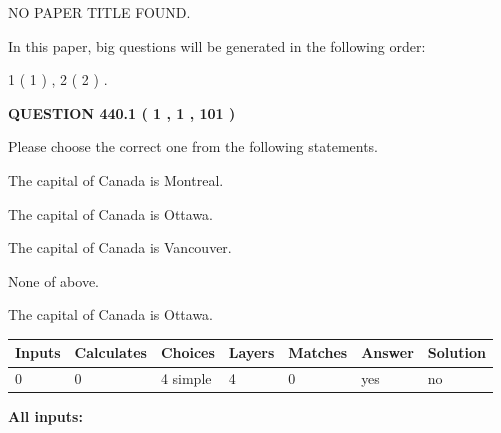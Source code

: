 \documentclass[12pt]{article}
\begin{document}
   
   
   
 NO PAPER TITLE FOUND.
   
   
   
\vspace{0.2in}
   
In this paper, big questions will be generated in the following order: 
   
   
   1 ( 1 )
 ,
   2 ( 2 )
 .
  
\vspace{0.2in}
  
{\textbf{\Large{QUESTION
440.1 
 ( 1 , 1 , 101 )
}}}
  
  
Please choose the correct one from the following statements.
 
 
The capital of Canada is Montreal.
 
 
The capital of Canada is Ottawa.
 
 
The capital of Canada is Vancouver.
 
 
 None of above.
 
 
\noindent{}
 
 
The capital of Canada is Ottawa.
 
 
\noindent{}
 
 
   
   
   
   
\noindent\begin{tabular}{|l|l|l|l|l|l|l|}
 \hline
Inputs & Calculates & Choices & Layers & Matches & Answer & Solution \\ \hline
 0  & 
 0  & 
 4
  simple  
  & 
 4  & 
 0  & 
  yes & 
  no 
  \\ \hline
 \end{tabular}
   
   
   
   
\noindent{}
   
   
   
   
\noindent\vspace{0.1in}\hspace{-0.08in} {\textbf{\Large{All inputs: }}}
   
   
  
\end{document}
